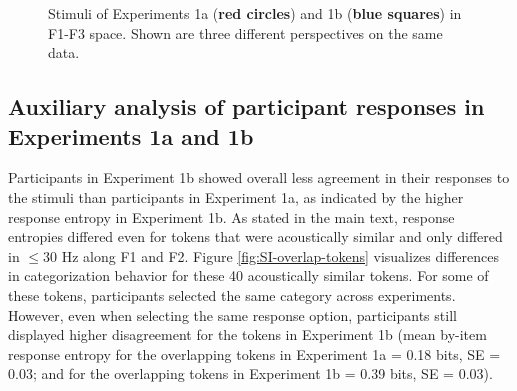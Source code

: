 \documentclass[preprint]{JASA}
\begin{document}
\begin{figure}

{\centering {}\newline{}\newline

}

\caption{Stimuli of Experiments 1a (\textbf{red circles}) and 1b (\textbf{blue squares}) in F1-F3 space. Shown are three different perspectives on the same data.}\label{fig:SI-plot-cues-3d}
\end{figure}

\subsection{Auxiliary analysis of participant responses in Experiments 1a and 1b}\label{sec:SI-aux-entropy}

Participants in Experiment 1b showed overall less agreement in their responses to the stimuli than participants in Experiment 1a, as indicated by the higher response entropy in Experiment 1b. As stated in the main text, response entropies differed even for tokens that were acoustically similar and only differed in \(\le 30\) Hz along F1 and F2. Figure \ref{fig:SI-overlap-tokens} visualizes differences in categorization behavior for these 40 acoustically similar tokens. For some of these tokens, participants selected the same category across experiments. However, even when selecting the same response option, participants still displayed higher disagreement for the tokens in Experiment 1b (mean by-item response entropy for the overlapping tokens in Experiment 1a = 0.18 bits, SE = 0.03; and for the overlapping tokens in Experiment 1b = 0.39 bits, SE = 0.03).
\end{document}
